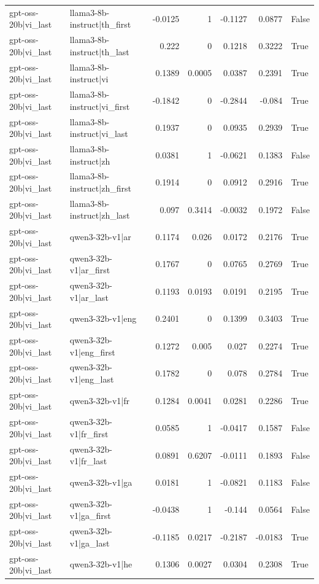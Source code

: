 \begin{table}
\begin{tabular}{l l r r r r l}
gpt-oss-20b|vi_last & llama3-8b-instruct|th_first & -0.0125 & 1 & -0.1127 & 0.0877 & False \\
gpt-oss-20b|vi_last & llama3-8b-instruct|th_last & 0.222 & 0 & 0.1218 & 0.3222 & True \\
gpt-oss-20b|vi_last & llama3-8b-instruct|vi & 0.1389 & 0.0005 & 0.0387 & 0.2391 & True \\
gpt-oss-20b|vi_last & llama3-8b-instruct|vi_first & -0.1842 & 0 & -0.2844 & -0.084 & True \\
gpt-oss-20b|vi_last & llama3-8b-instruct|vi_last & 0.1937 & 0 & 0.0935 & 0.2939 & True \\
gpt-oss-20b|vi_last & llama3-8b-instruct|zh & 0.0381 & 1 & -0.0621 & 0.1383 & False \\
gpt-oss-20b|vi_last & llama3-8b-instruct|zh_first & 0.1914 & 0 & 0.0912 & 0.2916 & True \\
gpt-oss-20b|vi_last & llama3-8b-instruct|zh_last & 0.097 & 0.3414 & -0.0032 & 0.1972 & False \\
gpt-oss-20b|vi_last & qwen3-32b-v1|ar & 0.1174 & 0.026 & 0.0172 & 0.2176 & True \\
gpt-oss-20b|vi_last & qwen3-32b-v1|ar_first & 0.1767 & 0 & 0.0765 & 0.2769 & True \\
gpt-oss-20b|vi_last & qwen3-32b-v1|ar_last & 0.1193 & 0.0193 & 0.0191 & 0.2195 & True \\
gpt-oss-20b|vi_last & qwen3-32b-v1|eng & 0.2401 & 0 & 0.1399 & 0.3403 & True \\
gpt-oss-20b|vi_last & qwen3-32b-v1|eng_first & 0.1272 & 0.005 & 0.027 & 0.2274 & True \\
gpt-oss-20b|vi_last & qwen3-32b-v1|eng_last & 0.1782 & 0 & 0.078 & 0.2784 & True \\
gpt-oss-20b|vi_last & qwen3-32b-v1|fr & 0.1284 & 0.0041 & 0.0281 & 0.2286 & True \\
gpt-oss-20b|vi_last & qwen3-32b-v1|fr_first & 0.0585 & 1 & -0.0417 & 0.1587 & False \\
gpt-oss-20b|vi_last & qwen3-32b-v1|fr_last & 0.0891 & 0.6207 & -0.0111 & 0.1893 & False \\
gpt-oss-20b|vi_last & qwen3-32b-v1|ga & 0.0181 & 1 & -0.0821 & 0.1183 & False \\
gpt-oss-20b|vi_last & qwen3-32b-v1|ga_first & -0.0438 & 1 & -0.144 & 0.0564 & False \\
gpt-oss-20b|vi_last & qwen3-32b-v1|ga_last & -0.1185 & 0.0217 & -0.2187 & -0.0183 & True \\
gpt-oss-20b|vi_last & qwen3-32b-v1|he & 0.1306 & 0.0027 & 0.0304 & 0.2308 & True \\

\end{tabular}
\end{table}
